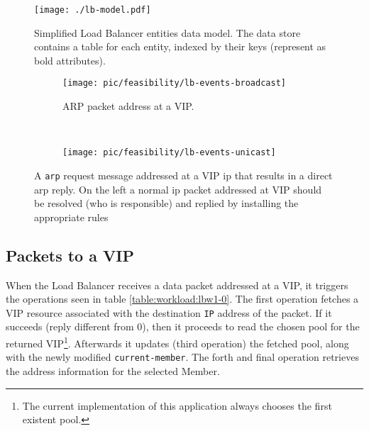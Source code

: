 \begin{figure}[H]
\centering 
\texttt{[image: ./lb-model.pdf]}
\caption{\small Simplified Load Balancer entities data model. The data
store contains a table for each entity, indexed by their keys (represent as bold attributes). }
\label{fig:lb-model}
\end{figure}


\begin{figure}
  \centering
  \begin{subfigure}[b]{0.5\textwidth}
                \centering
                \texttt{[image: pic/feasibility/lb-events-broadcast]}
                \caption{ARP packet address at a VIP.}
                \label{fig:lb:interaction:arp2Vip}
        \end{subfigure}%
        ~
        \begin{subfigure}[b]{0.5\textwidth}
                \centering
                \texttt{[image: pic/feasibility/lb-events-unicast]}
                \caption{}
                \label{fig:lb:interaction:ip2Vip}
        \end{subfigure}
        \caption[Load Balancer workload events]{A \texttt{\gls{arp}} request message addressed at a VIP \gls{ip} that results in a direct \gls{arp} reply. On the left a normal \gls{ip} packet addressed at VIP should be resolved (who is responsible) and replied by installing the appropriate rules}  
        \label{fig:lb:interaction}
\end{figure}

\subsection{Packets to a VIP}
When the Load Balancer  receives a data packet addressed
at a VIP, it triggers the operations seen in table
\ref{table:workload:lbw1-0}. 
The first operation fetches a VIP resource associated with the
destination \texttt{IP} address of the packet.
If it succeeds (reply different from 0), then it proceeds to read 
the chosen pool for the returned  VIP\footnote{The current implementation of this
application always chooses the first existent pool.}.
Afterwards it updates (third operation) the fetched  pool, along with the newly modified
\texttt{current-member}.
The forth and final operation retrieves
the address information for the selected  Member. 


